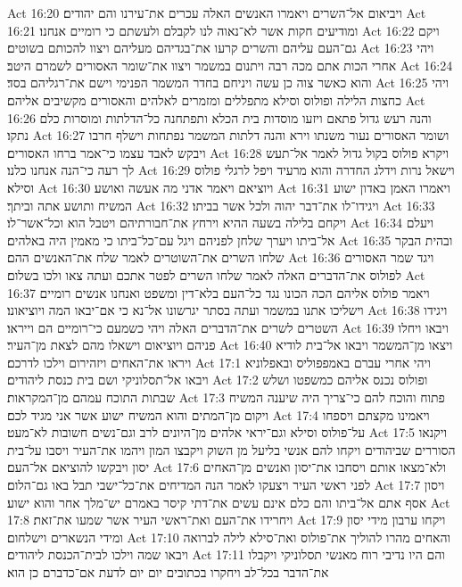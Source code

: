 Act 16:20  ויביאום אל־השרים ויאמרו האנשים האלה עכרים את־עירנו והם יהודים׃
Act 16:21  ומודיעים חקות אשר לא־נאוה לנו לקבלם ולעשתם כי רומיים אנחנו׃
Act 16:22  ויקם גם־העם עליהם והשרים קרעו את־בגדיהם מעליהם ויצוו להכותם בשוטים׃
Act 16:23  ויהי אחרי הכות אתם מכה רבה ויתנום במשמר ויצוו את־שומר האסורים לשמרם היטב׃
Act 16:24  והוא כאשר צוה כן עשה ויניחם בחדר המשמר הפנימי וישם את־רגליהם בסד׃
Act 16:25  ויהי כחצות הלילה ופולוס וסילא מתפללים ומזמרים לאלהים והאסורים מקשיבים אליהם׃
Act 16:26  והנה רעש גדול פתאם ויזעו מוסדות בית הכלא ותפתחנה כל־הדלתות ומוסרות כלם נתקו׃
Act 16:27  ושומר האסורים נעור משנתו וירא והנה דלתות המשמר נפתחות וישלף חרבו ויבקש לאבד עצמו כי־אמר ברחו האסורים׃
Act 16:28  ויקרא פולוס בקול גדול לאמר אל־תעש לך רעה כי־הנה אנחנו כלנו׃
Act 16:29  וישאל נרות וידלג החדרה והוא מרעיד ויפל לרגלי פולוס וסילא׃
Act 16:30  ויוציאם ויאמר אדני מה אעשה ואושע׃
Act 16:31  ויאמרו האמן באדון ישוע המשיח ותושע אתה וביתך׃
Act 16:32  ויגידו־לו את־דבר יהוה ולכל אשר בביתו׃
Act 16:33  ויקחם בלילה בשעה ההיא וירחץ את־חבורתיהם ויטבל הוא וכל־אשר־לו׃
Act 16:34  ויעלם אל־ביתו ויערך שלחן לפניהם ויגל עם־כל־ביתו כי מאמין היה באלהים׃
Act 16:35  ובהית הבקר שלחו השרים את־השוטרים לאמר שלח את־האנשים ההם׃
Act 16:36  ויגד שמר האסורים לפולוס את־הדברים האלה לאמר שלחו השרים לפטר אתכם ועתה צאו ולכו בשלום׃
Act 16:37  ויאמר פולוס אליהם הכה הכונו נגד כל־העם בלא־דין ומשפט ואנחנו אנשים רומיים וישליכו אתנו במשמר ועתה בסתר יגרשונו אל־נא כי אם־יבאו המה ויוציאונו׃
Act 16:38  ויגידו השטרים לשרים את־הדברים האלה ויהי כשמעם כי־רומיים הם וייראו׃
Act 16:39  ויבאו ויחלו פניהם ויוציאום וישאלו מהם לצאת מן־העיר׃
Act 16:40  ויצאו מן־המשמר ויבאו אל־בית לודיא ויראו את־האחים ויזהירום וילכו לדרכם׃
Act 17:1  ויהי אחרי עברם באמפפוליס ובאפלוניא ויבאו אל־תסלוניקי ושם בית כנסת ליהודים׃
Act 17:2  ופולוס נכנס אליהם כמשפטו ושלש שבתות התוכח עמהם מן־המקראות׃
Act 17:3  פתוח והוכח להם כי־צריך היה שיענה המשיח ויקום מן־המתים והוא המשיח ישוע אשר אני מגיד לכם׃
Act 17:4  ויאמינו מקצתם ויספחו על־פולוס וסילא וגם־יראי אלהים מן־היונים לרב וגם־נשים חשובות לא־מעט׃
Act 17:5  ויקנאו הסוררים שביהודים ויקחו להם אנשי בליעל מן השוק ויקבצו המון ויהמו את־העיר ויסבו על־בית יסון ויבקשו להוציאם אל־העם׃
Act 17:6  ולא־מצאו אותם ויסחבו את־יסון ואנשים מן־האחים לפני ראשי העיר ויצעקו לאמר הנה המדיחים את־כל־ישבי תבל באו גם־הלום׃
Act 17:7  ויסון אסף אתם אל־ביתו והם כלם אינם עשים את־דתי קיסר באמרם יש־מלך אחר והוא ישוע׃
Act 17:8  ויחרידו את־העם ואת־ראשי העיר אשר שמעו את־זאת׃
Act 17:9  ויקחו ערבון מידי יסון ומידי הנשארים וישלחום׃
Act 17:10  והאחים מהרו להוליך את־פולוס ואת־סילא לילה לברואה ויבאו שמה וילכו לבית־הכנסת ליהודים׃
Act 17:11  והם היו נדיבי רוח מאנשי תסלוניקי ויקבלו את־הדבר בכל־לב ויחקרו בכתובים יום יום לדעת אם־כדברם כן הוא׃
